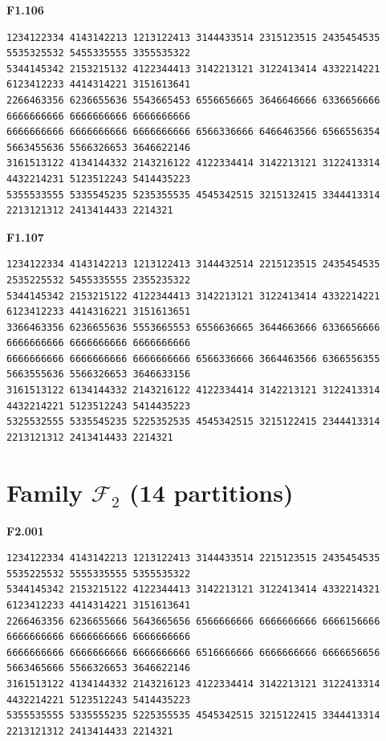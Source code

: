 \noindent\begin{minipage}{\linewidth}\textbf{F1.106}
\begin{lstlisting}
1234122334 4143142213 1213122413 3144433514 2315123515 2435454535 5535325532 5455335555 3355535322
5344145342 2153215132 4122344413 3142213121 3122413414 4332214221 6123412233 4414314221 3151613641
2266463356 6236655636 5543665453 6556656665 3646646666 6336656666 6666666666 6666666666 6666666666
6666666666 6666666666 6666666666 6566336666 6466463566 6566556354 5663455636 5566326653 3646622146
3161513122 4134144332 2143216122 4122334414 3142213121 3122413314 4432214231 5123512243 5414435223
5355533555 5335545235 5235355535 4545342515 3215132415 3344413314 2213121312 2413414433 2214321
\end{lstlisting}
\end{minipage}\par\smallskip

\noindent\begin{minipage}{\linewidth}\textbf{F1.107}
\begin{lstlisting}
1234122334 4143142213 1213122413 3144432514 2215123515 2435454535 2535225532 5455335555 2355235322
5344145342 2153215122 4122344413 3142213121 3122413414 4332214221 6123412233 4414316221 3151613651
3366463356 6236655636 5553665553 6556636665 3644663666 6336656666 6666666666 6666666666 6666666666
6666666666 6666666666 6666666666 6566336666 3664463566 6366556355 5663555636 5566326653 3646633156
3161513122 6134144332 2143216122 4122334414 3142213121 3122413314 4432214221 5123512243 5414435223
5325532555 5335545235 5225352535 4545342515 3215122415 2344413314 2213121312 2413414433 2214321
\end{lstlisting}
\end{minipage}\par\smallskip

\section*{\texorpdfstring{Family $\mathcal F_2$ (14 partitions)}{Family F2 (14)}}

\noindent\begin{minipage}{\linewidth}\textbf{F2.001}
\begin{lstlisting}
1234122334 4143142213 1213122413 3144433514 2215123515 2435454535 5535225532 5555335555 5355535322
5344145342 2153215122 4122344413 3142213121 3122413414 4332214321 6123412233 4414314221 3151613641
2266463356 6236655666 5643665656 6566666666 6666666666 6666156666 6666666666 6666666666 6666666666
6666666666 6666666666 6666666666 6516666666 6666666666 6666656656 5663465666 5566326653 3646622146
3161513122 4134144332 2143216123 4122334414 3142213121 3122413314 4432214221 5123512243 5414435223
5355535555 5335555235 5225355535 4545342515 3215122415 3344413314 2213121312 2413414433 2214321
\end{lstlisting}
\end{minipage}\par\smallskip

